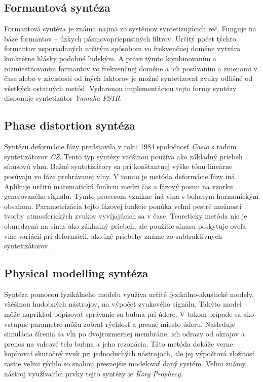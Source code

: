 \subsection{Formantová syntéza}

Formantová syntéza je známa najmä zo systémov syntetizujúcich reč. Funguje na báze formantov -- úzkych pásmovopriepustných filtrov. Určitý počet týchto formantov usporiadaných určitým spôsobom vo frekvenčnej doméne vytvára konkrétne hlásky podobné ľudským. A práve týmto kombinovaním a rozmiestňovaním formantov vo frekvenčnej doméne a ich posúvaním a zmenami v čase alebo v závislosti od iných faktorov je možné syntetizovať zvuky odlišné od všetkých ostatných metód. Vydarenou implementáciou tejto formy syntézy disponuje syntetizátor \emph{Yamaha FS1R}.

\subsection{Phase distortion syntéza}

Syntézu deformácie fázy predstavila v roku 1984 spoločnosť \emph{Casio} s radom syntetizátorov \emph{CZ}. Tento typ syntézy väčšinou používa ako základný priebeh sínusovú vlnu. Bežné syntetizátory sa pri konštantnej výške tónu lineárne posúvaju vo fáze prehrávanej vlny. V tomto je metóda deformácie fázy iná. Aplikuje určitú matematickú funkciu medzi čas a fázový posun na vzorku generovaného signálu. Týmto procesom vznikne iná vlna s bohatým harmonickým obsahom. Parametrizácia tejto fázovej funkcie ponúka veľmi pestré možnosti tvorby atmosferických zvukov vyvíjajúcich sa v čase. Teoreticky metóda nie je obmedzená na sínus ako základný priebeh, ale použitie sínusu poskytuje oveľa viac variácií pri deformácii, ako iné priebehy známe zo subtraktívnych syntetizátorov. 

\subsection{Physical modelling syntéza}

Syntéza pomocou fyzikálneho modelu využíva určité fyzikálno-akustické modely, väčšinou hudobných nástrojov, na výpočet zvukového signálu. Takýto model môže napríklad popisovať správanie sa bubna pri údere. V takom prípade sa ako vstupné parametre môžu zobrať rýchlosť a presné miesto úderu. Nasleduje simulácia šírenia sa vĺn po dvojrozmernej membráne, ich odrazy od okrajov a prenos na valcové telo bubna a jeho rezonácia. Táto metóda dokáže verne kopírovať skutočný zvuk pri jednoduchých nástrojoch, ale jej výpočtová zložitosť rastie veľmi rýchlo so snahou presnejšie modelovať daný systém. Veľmi známy nástroj využívajúci prvky tejto syntézy je \emph{Korg Prophecy}.

